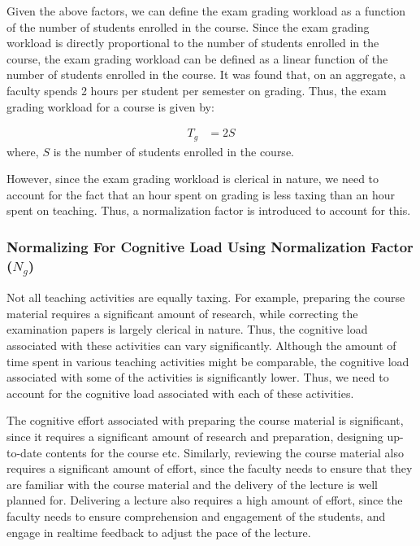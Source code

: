 Given the above factors, we can define the exam grading workload as a function of the number of students enrolled in the course. Since the exam grading workload is directly proportional to the number of students enrolled in the course, the exam grading workload can be defined as a linear function of the number of students enrolled in the course. It was found that, on an aggregate, a faculty spends 2 hours per student per semester on grading. Thus, the exam grading workload for a course is given by:

\begin{equation*}
  \begin{aligned}
    T_g & = 2 S
  \end{aligned}
\end{equation*}
where, \(S\) is the number of students enrolled in the course.

However, since the exam grading workload is clerical in nature, we need to account for the fact that an hour spent on grading is less taxing than an hour spent on teaching. Thus, a normalization factor is introduced to account for this.

\subsubsection{Normalizing For Cognitive Load Using Normalization Factor (\(N_g\))}

Not all teaching activities are equally taxing. For example, preparing the course material requires a significant amount of research, while correcting the examination papers is largely clerical in nature. Thus, the cognitive load associated with these activities can vary significantly. Although the amount of time spent in various teaching activities might be comparable, the cognitive load associated with some of the activities is significantly lower. Thus, we need to account for the cognitive load associated with each of these activities.

The cognitive effort associated with preparing the course material is significant, since it requires a significant amount of research and preparation, designing up-to-date contents for the course etc. Similarly, reviewing the course material also requires a significant amount of effort, since the faculty needs to ensure that they are familiar with the course material and the delivery of the lecture is well planned for. Delivering a lecture also requires a high amount of effort, since the faculty needs to ensure comprehension and engagement of the students, and engage in realtime feedback to adjust the pace of the lecture.


